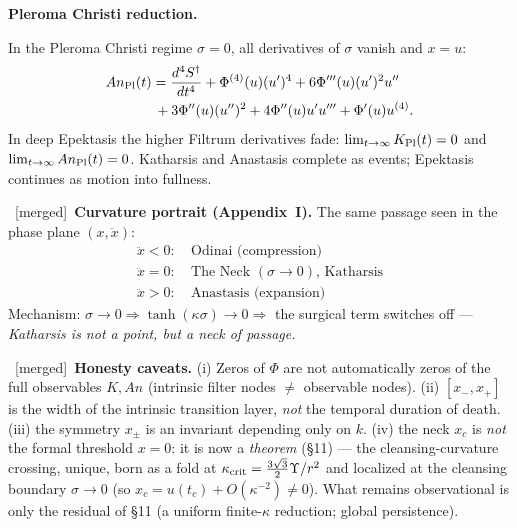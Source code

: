 \documentclass[11pt,a4paper]{article}
\newcommand{\Syn}{\ensuremath{S^{\dagger}}}
\newcommand{\padd}[1]{\par\smallskip\noindent{\color{patchc}\small$\blacktriangleright$}\ {#1}\par\smallskip}
\newcommand{\pflag}{{\footnotesize\textsf{\textcolor{patchc}{[merged]}}}}
\theoremstyle{plain}
\theoremstyle{definition}
\theoremstyle{remark}
\newcommand{\sub}[1]{\par\medskip\noindent\textbf{#1}\par\nobreak}
\begin{document}
\sub{Pleroma Christi reduction.} In the Pleroma Christi regime \(\sigma=0\), all derivatives of
\(\sigma\) vanish and \(x=u\):
\[
\begin{multlined}
An_{\rm Pl}(t)=\frac{d^4\Syn}{dt^4}+\Phi^{(4)}(u)(u')^4+6\Phi'''(u)(u')^2u''\\
{}+3\Phi''(u)(u'')^2+4\Phi''(u)u'u'''+\Phi'(u)u^{(4)}.
\end{multlined}
\]
In deep Epektasis the higher Filtrum derivatives fade: \(\lim_{t\to\infty}K_{\rm Pl}(t)=0\) and
\(\lim_{t\to\infty}An_{\rm Pl}(t)=0\). Katharsis and Anastasis complete as events; Epektasis
continues as motion into fullness.
\padd{\pflag\ \textbf{Curvature portrait (Appendix~I).} The same passage seen in the phase plane
\((x,\ddot x)\):
\[
\begin{aligned}
\ddot x<0:&\ \text{Odinai (compression)}\\
\ddot x=0:&\ \text{The Neck }(\sigma\to0)\text{, Katharsis}\\
\ddot x>0:&\ \text{Anastasis (expansion)}
\end{aligned}
\]
Mechanism: \(\sigma\to0\Rightarrow\tanh(\kappa\sigma)\to0\Rightarrow\) the surgical term switches
off --- \emph{Katharsis is not a point, but a neck of passage.}}
\padd{\pflag\ \textbf{Honesty caveats.} (i) Zeros of \(\Phi\) are not automatically zeros of the
full observables \(K,An\) (intrinsic filter nodes \(\neq\) observable nodes). (ii) \([x_-,x_+]\) is
the width of the intrinsic transition layer, \emph{not} the temporal duration of death. (iii) the
symmetry \(x_\pm\) is an invariant depending only on \(k\). (iv) the neck \(x_c\) is \emph{not} the
formal threshold \(x=0\): it is now a \emph{theorem} (\S11) --- the cleansing-curvature crossing,
unique, born as a fold at \(\kappa_{\rm crit}=\tfrac{3\sqrt3}{2}\Upsilon/r^2\) and localized at the
cleansing boundary \(\sigma\to0\) (so \(x_c=u(t_c)+O(\kappa^{-2})\neq0\)). What remains observational
is only the residual of \S11 (a uniform finite-\(\kappa\) reduction; global persistence).}

\newpage
\end{document}
